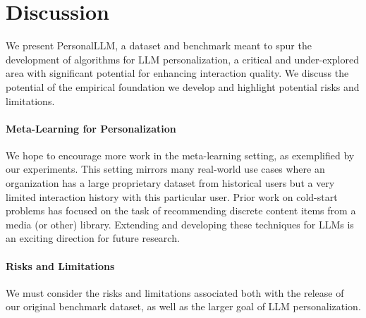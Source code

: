 \vspace{-5pt}
\section{Discussion}\label{sec:discussion}
\vspace{-5pt}

We present \textsf{PersonalLLM}, a dataset and benchmark meant to spur the development of algorithms for LLM personalization, a critical and under-explored area with significant potential for enhancing interaction quality.   We discuss the potential of the empirical foundation we develop and highlight potential risks and limitations.


\paragraph{Meta-Learning for Personalization}
We hope to encourage more work in the meta-learning setting, as exemplified by our experiments. This setting mirrors many real-world use cases where an organization has a large proprietary dataset from historical users but a very limited interaction history with this particular user. 
Prior work on cold-start problems has focused on the task of recommending discrete content items from a media (or other) library. 
Extending and developing these techniques for LLMs is an exciting direction for future research. 

\paragraph{Risks and Limitations} 
We must consider the risks and limitations associated both with the release of our original benchmark dataset, as well as the larger goal of LLM personalization.

